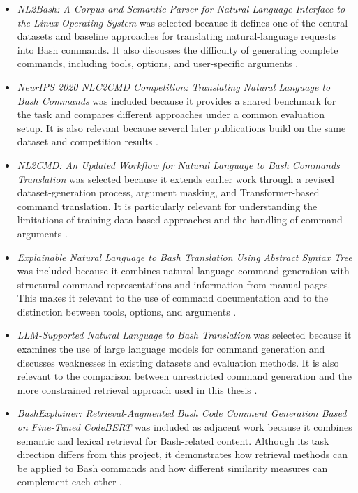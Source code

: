 \begin{itemize}
    \item \textit{NL2Bash: A Corpus and Semantic Parser for Natural Language Interface to the Linux Operating System} was selected because it defines one of the central datasets and baseline approaches for translating natural-language requests into Bash commands. It also discusses the difficulty of generating complete commands, including tools, options, and user-specific arguments \cite{lin2018nl2bash}.

    \item \textit{NeurIPS 2020 NLC2CMD Competition: Translating Natural Language to Bash Commands} was included because it provides a shared benchmark for the task and compares different approaches under a common evaluation setup. It is also relevant because several later publications build on the same dataset and competition results \cite{agarwal2021nlc2cmd}. 
    
    \item \textit{NL2CMD: An Updated Workflow for Natural Language to Bash Commands Translation} was selected because it extends earlier work through a revised dataset-generation process, argument masking, and Transformer-based command translation. It is particularly relevant for understanding the limitations of training-data-based approaches and the handling of command arguments \cite{fu2023nl2cmd}. 
    
    \item \textit{Explainable Natural Language to Bash Translation Using Abstract Syntax Tree} was included because it combines natural-language command generation with structural command representations and information from manual pages. This makes it relevant to the use of command documentation and to the distinction between tools, options, and arguments \cite{bharadwaj2021explainable}. 
    
    \item \textit{LLM-Supported Natural Language to Bash Translation} was selected because it examines the use of large language models for command generation and discusses weaknesses in existing datasets and evaluation methods. It is also relevant to the comparison between unrestricted command generation and the more constrained retrieval approach used in this thesis \cite{westenfelder2025llm}. 
    
    \item \textit{BashExplainer: Retrieval-Augmented Bash Code Comment Generation Based on Fine-Tuned CodeBERT} was included as adjacent work because it combines semantic and lexical retrieval for Bash-related content. Although its task direction differs from this project, it demonstrates how retrieval methods can be applied to Bash commands and how different similarity measures can complement each other \cite{yu2022bashexplainer}.

\end{itemize}

